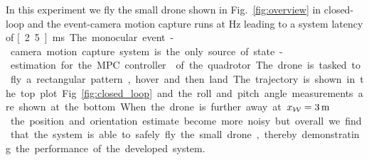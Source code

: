 In this experiment we fly the small drone shown in Fig.~\ref{fig:overview} in closed-loop and the event-camera motion capture runs at \unit[400]{Hz} leading to a system latency of \unit[2.5]{ms}. The monocular event-camera motion capture system is the only source of state-estimation for the MPC controller~\cite{foehn2022agilicious} of the quadrotor. The drone is tasked to fly a rectangular pattern, hover and then land. The trajectory is shown in the top plot Fig.~\ref{fig:closed_loop} and the roll and pitch angle measurements are shown at the bottom. When the drone is further away at {$x_\wfr=\unit[3]{m}$} the position and orientation estimate become more noisy but overall we find that the system is able to safely fly the small drone, thereby demonstrating the performance of the developed system.

